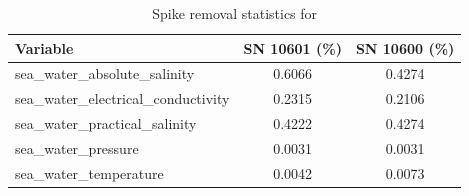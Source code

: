 \begin{table}[h]
\centering
\caption{Spike removal statistics for \projectname{} \casenumber{}}
\label{tab:spike_stats}
\begin{tabular}{|l|c|c|}
\hline
Variable & SN 10601 (\%) & SN 10600 (\%) \\
\hline
sea\_water\_absolute\_salinity & 0.6066 & 0.4274 \\
sea\_water\_electrical\_conductivity & 0.2315 & 0.2106 \\
sea\_water\_practical\_salinity & 0.4222 & 0.4274 \\
sea\_water\_pressure & 0.0031 & 0.0031 \\
sea\_water\_temperature & 0.0042 & 0.0073 \\
\hline
\end{tabular}
\end{table}
